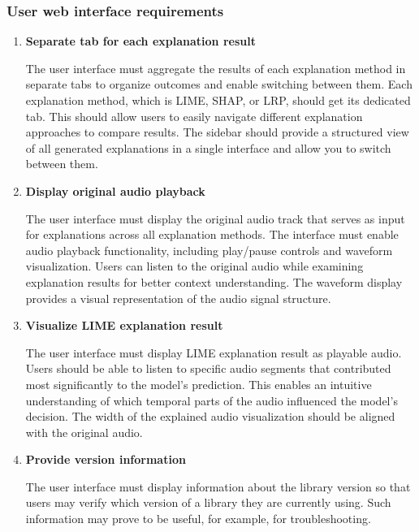 \documentclass[
    bindingoffset=5mm,  %
    footnoteindent=3mm, %
    hyphenation=true    %
]{src/wut-thesis}
\begin{document}
\subsubsection{User web interface requirements}
    \begin{enumerate}[itemsep=1\baselineskip]
    \item \textbf{Separate tab for each explanation result}

            The user interface must aggregate the results of each explanation method in separate tabs to organize
        outcomes and enable switching between them. Each explanation method, which is LIME, SHAP, or LRP,
        should get its dedicated tab. This should allow users to easily navigate different explanation approaches
        to compare results. The sidebar should provide a structured view of all generated explanations in a single
        interface and allow you to switch between them.

    \item \textbf{Display original audio playback}

        The user interface must display the original audio track that serves as input for explanations across all
    explanation methods. The interface must enable audio playback functionality, including play/pause controls and
    waveform visualization. Users can listen to the original audio while examining explanation results for better
    context understanding. The waveform display provides a visual representation of the audio signal structure.

    \item \textbf{Visualize LIME explanation result}

        The user interface must display LIME explanation result as playable audio.
    Users should be able to listen to specific audio segments that contributed most significantly
    to the model's prediction. This enables an intuitive understanding of which temporal parts of
    the audio influenced the model's decision. The width of the explained audio visualization
    should be aligned with the original audio.

    \item \textbf{Provide version information}

        The user interface must display information about the library version so that users may verify which
    version of a library they are currently using. Such information may prove to be useful,
    for example, for troubleshooting.


\end{enumerate}
\end{document}
